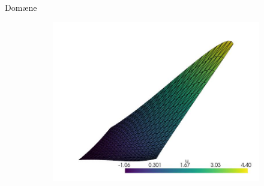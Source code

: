 \begin{frame}{Domæne}
\begin{figure}
\begin{subfigure}{.49\textwidth}
        \includegraphics[width=\textwidth]{figurer/screenshot_3.jpeg}
    \end{subfigure}
\end{figure}
\end{frame}
